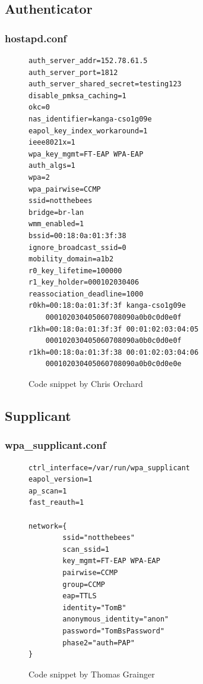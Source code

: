 \documentclass[12pt,a4paper,titlepage]{article}
\begin{document}
\subsection{Authenticator}
\label{sec:Code;sub:authenticator}

\subsubsection{hostapd.conf}
\begin{figure}[h!]
\begin{Verbatim}[frame=single]
auth_server_addr=152.78.61.5
auth_server_port=1812
auth_server_shared_secret=testing123
disable_pmksa_caching=1
okc=0
nas_identifier=kanga-cso1g09e
eapol_key_index_workaround=1
ieee8021x=1
wpa_key_mgmt=FT-EAP WPA-EAP
auth_algs=1
wpa=2
wpa_pairwise=CCMP
ssid=notthebees
bridge=br-lan
wmm_enabled=1
bssid=00:18:0a:01:3f:38
ignore_broadcast_ssid=0
mobility_domain=a1b2
r0_key_lifetime=100000
r1_key_holder=000102030406
reassociation_deadline=1000
r0kh=00:18:0a:01:3f:3f kanga-cso1g09e
	000102030405060708090a0b0c0d0e0f
r1kh=00:18:0a:01:3f:3f 00:01:02:03:04:05
	000102030405060708090a0b0c0d0e0f
r1kh=00:18:0a:01:3f:38 00:01:02:03:04:06
	000102030405060708090a0b0c0d0e0e
\end{Verbatim}
\caption{Code snippet by Chris Orchard}
\end{figure}

\subsection{Supplicant}
\label{sec:Code;sub:supplicant}

\subsubsection{wpa\_supplicant.conf}
\begin{figure}[h!]
\begin{Verbatim}[frame=single]
ctrl_interface=/var/run/wpa_supplicant
eapol_version=1
ap_scan=1
fast_reauth=1

network={
        ssid="notthebees"
        scan_ssid=1
        key_mgmt=FT-EAP WPA-EAP
        pairwise=CCMP
        group=CCMP
        eap=TTLS
        identity="TomB"
        anonymous_identity="anon"
        password="TomBsPassword"
        phase2="auth=PAP"
}
\end{Verbatim}
\caption{Code snippet by Thomas Grainger}
\end{figure}

\newpage
\end{document}
